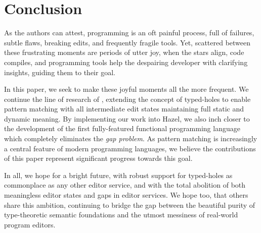 \section{Conclusion}\label{sec:conclusion}
As the authors can attest, programming is an oft painful process, full of failures, subtle flaws, breaking edits, and frequently fragile tools. Yet, scattered between these frustrating moments are periods of utter joy, when the stars align, code compiles, and programming tools help the despairing developer with clarifying insights, guiding them to their goal. 

In this paper, we seek to make these joyful moments all the more frequent. We continue the line of research of \cite{DBLP:conf/popl/OmarVHAH17,DBLP:conf/snapl/OmarVHSGAH17}, extending the concept of typed-holes to enable pattern matching with all intermediate edit states maintaining full static and dynamic meaning. By implementing our work into Hazel, we also inch closer to the development of the first fully-featured functional programming language which completely eliminates the \emph{gap problem}. As pattern matching is increasingly a central feature of modern programming languages, we believe the contributions of this paper represent significant progress towards this goal.

In all, we hope for a bright future, with robust support for typed-holes as commonplace as any other editor service, and with the total abolition of both meaningless editor states and gaps in editor services. We hope too, that others share this ambition, continuing to bridge the gap between the beautiful purity of type-theoretic semantic foundations and the utmost messiness of real-world program editors. 